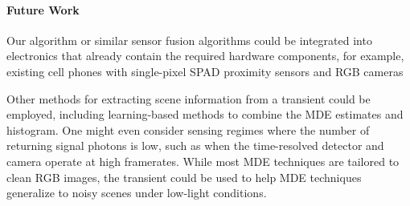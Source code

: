 


\paragraph{Future Work}
 Our algorithm or similar sensor fusion algorithms could
 be integrated into electronics that already contain the required hardware
components, for example, existing cell phones with single-pixel SPAD
proximity sensors and RGB cameras 


Other methods for extracting scene information from a transient could be
employed, including learning-based methods to combine the MDE estimates and
histogram. One might even consider sensing regimes where the number of
returning signal photons is low, such as when the time-resolved detector and
camera operate at high framerates. While most MDE techniques are tailored to
clean RGB images, the transient could be used to help MDE techniques generalize
to noisy scenes under low-light conditions.


